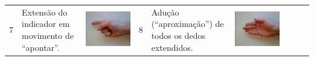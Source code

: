 \begin{table}[htb]
\begin{tabular}{m{0.5cm} m{1.5cm} m{2cm} | m{0.5cm} m{1.5cm} m{2cm} | m{0.5cm} m{1.5cm} m{2cm}}
		7	&	Extensão do indicador em movimento de ``apontar''.	& \includegraphics[width=\linewidth]{./img/moves/mov7.png} &
		8	&	Adução (``aproximação'') de todos os dedos extendidos.	& \includegraphics[width=\linewidth]{./img/moves/mov8.png} &

\end{tabular}
\end{table}
